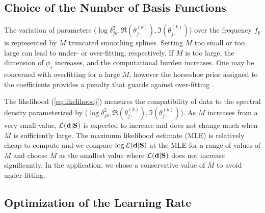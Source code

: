 \documentclass[%
 reprint,
 amsmath,amssymb,
 aps,
]{revtex4-2}
\begin{document}
\subsection{Choice of the Number of Basis Functions} \label{subsec:choice_of_nbasis}

The variation of parameters ($\log \delta^2_{jk},\Re(\theta^{(k)}_{j\cdot}),\Im(\theta^{(k)}_{j\cdot})$) over the frequency $f_k$ is represented by $M$ truncated smoothing splines. Setting $M$ too small or too large can lead to under- or over-fitting, respectively. If $M$ is too large, the dimension of $\phi_j$ increases, and the computational burden increases. One may be concerned with overfitting for a large $M$, however the horseshoe prior assigned to the coefficients provides a penalty that guards against over-fitting \citep{10.1214/17-EJS1337SI}.

The likelihood (\ref{eq:likelihoodj}) measures the compatibility of data to the spectral density parameterized by ($\log \delta^2_{jk},\Re(\theta^{(k)}_{j\cdot}),\Im(\theta^{(k)}_{j\cdot})$). As $M$ increases from a very small value, $\mathcal{L}({\bf d}|{\bf S})$ is expected to increase and does not change much when $M$ is sufficiently large. 
The maximum likelihood estimate (MLE) is relatively cheap to compute and we compare $\log \mathcal{L}({\bf d}|{\bf S})$ at the MLE for a range of values of $M$ and choose $M$ as the smallest value where $\mathcal{L}({\bf d}|{\bf S})$ does not increase significantly. 
In the application, we chose a conservative value of $M$ to avoid under-fitting. 
 





\subsection{Optimization of the Learning Rate}\label{subsec:learningrate}
\end{document}
